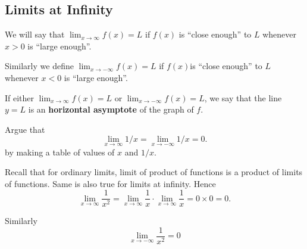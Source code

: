 \documentclass[../calc1-main.tex]{subfiles}
\begin{document}
  \subsection*{Limits at Infinity}
  \begin{definition}
    We will say that $\lim_{x \to \infty} f(x)=L$ if $f(x)$ is ``close enough'' to $L$ whenever $x>0$ is ``large enough''.

    Similarly we define $\lim_{x \to -\infty} f(x) = L$ if $f(x)$is ``close enough'' to $L$ whenever $x<0$ is ``large enough''.

    If either $\lim_{x \to \infty} f(x)=L$ or $\lim_{x \to -\infty} f(x)=L$, we say that the line $y=L$ is an \textbf{horizontal asymptote} of the graph of $f$.
  \end{definition}

  \begin{example}
    Argue that
    \[
      \lim_{x \to \infty} 1/x = \lim_{x \to -\infty} 1/x = 0.
    \]
    by making a table of values of $x$ and $1/x$.

    \begin{figure}[H]
      \centering
      
    \end{figure}
  \end{example}
  Recall that for ordinary limits, limit of product of functions is a product of limits of functions. Same is also true for limits at infinity. Hence
  \[
    \lim_{x \to \infty} \frac{1}{x^2} =
    \lim_{x \to \infty} \frac{1}{x}  \cdot \lim_{x \to \infty} \frac{1}{x}  = 0 \times 0 = 0.
  \]

  Similarly
  \[
    \lim_{x \to -\infty} \frac{1}{x^2} = 0
  \]
\end{document}
